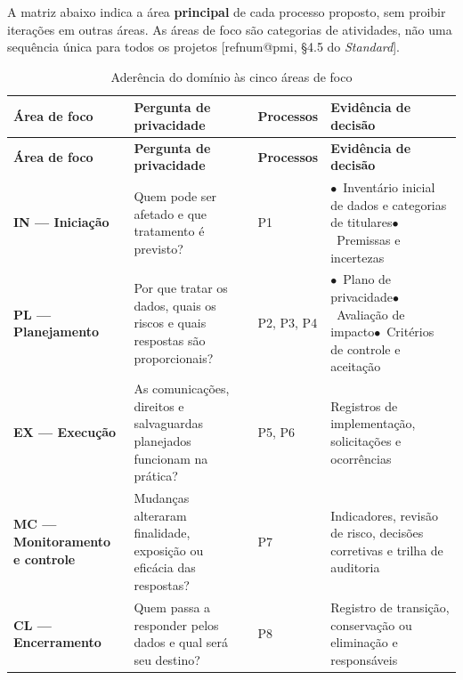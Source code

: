 \documentclass[12pt,a4paper,article,oneside,english,brazil]{abntex2}
\makeatletter
\newcommand{\fontetab}[1]{\par\vspace{3pt}{\small\noindent Fonte: #1\par}}
\newcommand{\refnum}[1]{\csname refnum@#1\endcsname}
\makeatother
\begin{document}
A matriz abaixo indica a área \textbf{principal} de cada processo proposto, sem proibir iterações em outras áreas. As áreas de foco são categorias de atividades, não uma sequência única para todos os projetos [\refnum{pmi}, §4.5 do \textit{Standard}].

\begingroup\SingleSpacing\footnotesize
\begin{longtable}{@{}>{\raggedright\arraybackslash}p{}>{\raggedright\arraybackslash}p{}>{\raggedright\arraybackslash}p{}>{\raggedright\arraybackslash}p{}@{}}
\caption{Aderência do domínio às cinco áreas de foco}\label{tab:t8}\\
\hline
\textbf{Área de foco} & \textbf{Pergunta de privacidade} & \textbf{Processos} & \textbf{Evidência de decisão}\\
\hline
\endfirsthead
\hline
\textbf{Área de foco} & \textbf{Pergunta de privacidade} & \textbf{Processos} & \textbf{Evidência de decisão}\\
\hline
\endhead
\hline
\endfoot
\hline
\endlastfoot
\textbf{IN — Iniciação} & Quem pode ser afetado e que tratamento é previsto? & P1 & $\bullet$~Inventário inicial de dados e categorias de titulares\newline$\bullet$~Premissas e incertezas\\[3pt]
\textbf{PL — Planejamento} & Por que tratar os dados, quais os riscos e quais respostas são proporcionais? & P2, P3, P4 & $\bullet$~Plano de privacidade\newline$\bullet$~Avaliação de impacto\newline$\bullet$~Critérios de controle e aceitação\\[3pt]
\textbf{EX — Execução} & As comunicações, direitos e salvaguardas planejados funcionam na prática? & P5, P6 & Registros de implementação, solicitações e ocorrências\\[3pt]
\textbf{MC — Monitoramento e controle} & Mudanças alteraram finalidade, exposição ou eficácia das respostas? & P7 & Indicadores, revisão de risco, decisões corretivas e trilha de auditoria\\[3pt]
\textbf{CL — Encerramento} & Quem passa a responder pelos dados e qual será seu destino? & P8 & Registro de transição, conservação ou eliminação e responsáveis\\[3pt]
\end{longtable}
\endgroup
\fontetab{Elaborado pelos autores (2026).}
\end{document}

